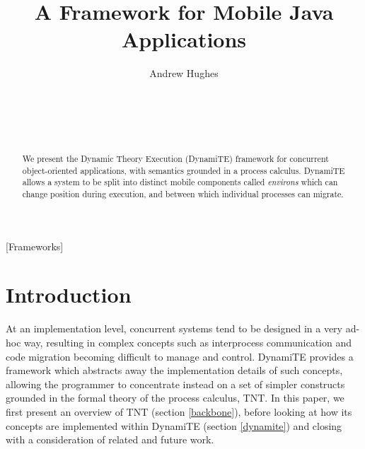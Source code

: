 \documentclass{acm_proc_article-sp}
\begin{document}
\title{A Framework for Mobile Java Applications}
\author{
\alignauthor
Andrew Hughes\\
       \\
       \\
       \\
       \\
}
\maketitle

\begin{abstract}
We present the Dynamic Theory Execution (DynamiTE) framework for
 concurrent object-oriented applications, with semantics grounded in a
 process calculus.  DynamiTE allows a system to be split into distinct
 mobile components called \emph{environs} which can change position
 during execution, and between which individual processes can migrate.
\end{abstract}

[Frameworks]



\section{Introduction}

At an implementation level, concurrent systems tend to be designed in a
very ad-hoc way, resulting in complex concepts such as interprocess
communication and code migration becoming difficult to manage and
control.  DynamiTE provides a framework which abstracts away the
implementation details of such concepts, allowing the programmer to
concentrate instead on a set of simpler constructs grounded in the formal
theory of the process calculus, TNT.  In this paper, we first present an
overview of TNT (section \ref{backbone}), before looking at how its
concepts are implemented within DynamiTE (section \ref{dynamite}) and
closing with a consideration of related and future work.
 
\end{document}
